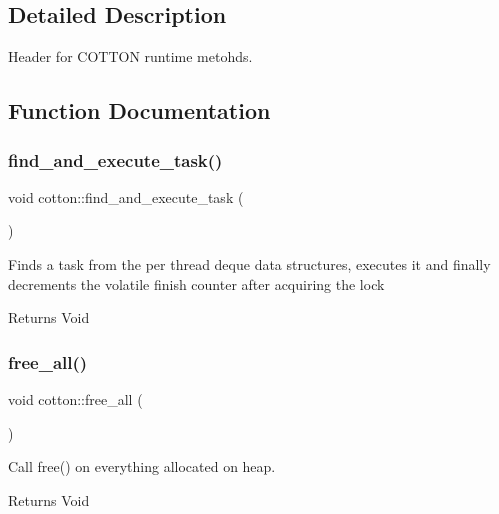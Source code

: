 

\subsection{Detailed Description}
Header for C\+O\+T\+T\+ON runtime metohds. 



\subsection{Function Documentation}
\mbox{\label{cotton-runtime_8h_file_af22caee9434a7e06a09b2f9a0417c1eb}} 
\subsubsection{\texorpdfstring{find\+\_\+and\+\_\+execute\+\_\+task()}{find\_and\_execute\_task()}}
{\footnotesize\ttfamily void cotton\+::find\+\_\+and\+\_\+execute\+\_\+task (\begin{DoxyParamCaption}{ }\end{DoxyParamCaption})}

Finds a task from the per thread deque data structures, executes it and finally decrements the volatile finish counter after acquiring the lock

\begin{DoxyReturn}{Returns}
Void 
\end{DoxyReturn}
\mbox{\label{cotton-runtime_8h_file_ad169fe95f5f03bdfa569dd365dde6c12}} 
\subsubsection{\texorpdfstring{free\+\_\+all()}{free\_all()}}
{\footnotesize\ttfamily void cotton\+::free\+\_\+all (\begin{DoxyParamCaption}{ }\end{DoxyParamCaption})}

Call free() on everything allocated on heap.

\begin{DoxyReturn}{Returns}
Void 
\end{DoxyReturn}
\mbox{\label{cotton-runtime_8h_file_ab1ebe1f6821a54e7c4911c22acebff8a}} 
